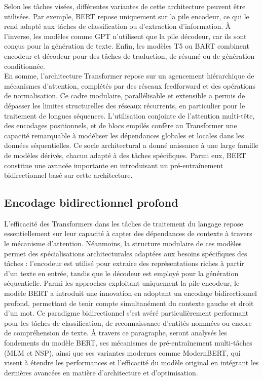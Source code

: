 Selon les tâches visées, différentes variantes de cette architecture peuvent être utilisées. Par exemple, BERT repose uniquement sur la pile encodeur, ce qui le rend adapté aux tâches de classification ou d’extraction d’information. À l’inverse, les modèles comme GPT n’utilisent que la pile décodeur, car ils sont conçus pour la génération de texte. Enfin, les modèles T5 \citep{raffel2020t5} ou BART \citep{lewis2019bart} combinent encodeur et décodeur pour des tâches de traduction, de résumé ou de génération conditionnée.\\

En somme, l’architecture Transformer repose sur un agencement hiérarchique de mécanismes d’attention, complétés par des réseaux feedforward et des opérations de normalisation. Ce cadre modulaire, parallélisable et extensible a permis de dépasser les limites structurelles des réseaux récurrents, en particulier pour le traitement de longues séquences. L’utilisation conjointe de l’attention multi-tête, des encodages positionnels, et de blocs empilés confère au Transformer une capacité remarquable à modéliser les dépendances globales et locales dans les données séquentielles. Ce socle architectural a donné naissance à une large famille de modèles dérivés, chacun adapté à des tâches spécifiques. Parmi eux, BERT constitue une avancée importante en introduisant un pré-entraînement bidirectionnel basé sur cette architecture. 

\subsection{Encodage bidirectionnel profond}

L’efficacité des Transformers dans les tâches de traitement du langage repose essentiellement sur leur capacité à capter des dépendances de contexte à travers le mécanisme d’attention. Néanmoins, la structure modulaire de ces modèles permet des spécialisations architecturales adaptées aux besoins spécifiques des tâches : l’encodeur est utilisé pour extraire des représentations riches à partir d’un texte en entrée, tandis que le décodeur est employé pour la génération séquentielle. Parmi les approches exploitant uniquement la pile encodeur, le modèle BERT a introduit une innovation en adoptant un encodage bidirectionnel profond, permettant de tenir compte simultanément du contexte gauche et droit d’un mot. Ce paradigme bidirectionnel s’est avéré particulièrement performant pour les tâches de classification, de reconnaissance d'entités nommées ou encore de compréhension de texte. À travers ce paragraphe, seront analysés les fondements du modèle BERT, ses mécanismes de pré-entraînement multi-tâches (MLM et NSP), ainsi que ses variantes modernes comme ModernBERT, qui visent à étendre les performances et l'efficacité du modèle original en intégrant les dernières avancées en matière d'architecture et d’optimisation.


